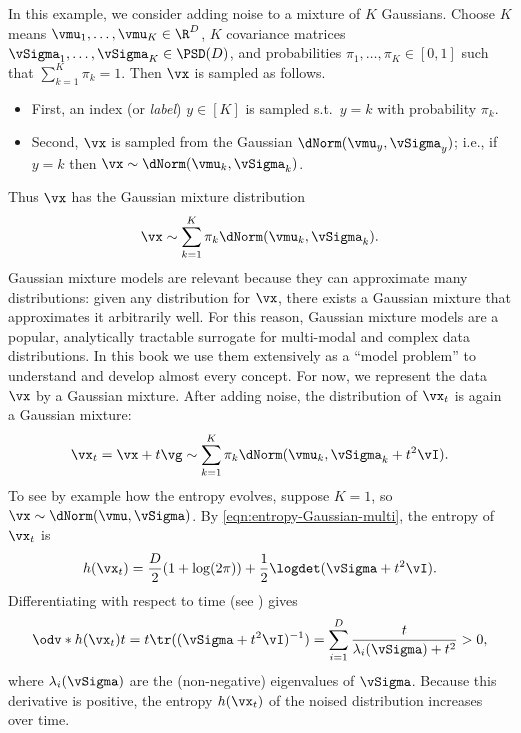 \documentclass[../../book-main.tex]{subfiles}
\begin{document}
\begin{example}\label{ex:gaussian_mixture}
    In this example, we consider adding noise to a mixture of \(K\)
    Gaussians. Choose \(K\) means
    \(\vmu_{1}, \dots, \vmu_{K} \in \R^{D}\), \(K\) covariance
    matrices \(\vSigma_{1}, \dots, \vSigma_{K} \in \PSD(D)\), and
    probabilities \(\pi_{1}, \dots, \pi_{K} \in [0, 1]\) such that
    \(\sum_{k = 1}^{K}\pi_{k} = 1\). Then \(\vx\) is sampled as
    follows.
    \begin{itemize}
        \item First, an index (or \textit{label}) \(y \in [K]\) is
            sampled s.t.~\(y = k\) with probability \(\pi_{k}\).
        \item Second, \(\vx\) is sampled from the Gaussian
            \(\dNorm(\vmu_{y}, \vSigma_{y})\); i.e., if \(y = k\) then
            \(\vx \sim \dNorm(\vmu_{k}, \vSigma_{k})\).
    \end{itemize}
    Thus \(\vx\) has the Gaussian mixture distribution
    \begin{equation}
        \vx \sim \sum_{k = 1}^{K}\pi_{k}\dNorm(\vmu_{k}, \vSigma_{k}).
    \end{equation}
    Gaussian mixture models are relevant because they can approximate
    many distributions: given any distribution for \(\vx\), there
    exists a Gaussian mixture that approximates it arbitrarily well.
    For this reason, Gaussian mixture models are a popular,
    analytically tractable surrogate for multi-modal and complex data
    distributions. In this book we use them extensively as a ``model
    problem'' to understand and develop almost every concept. For now,
    we represent the data \(\vx\) by a Gaussian mixture. After adding
    noise, the distribution of \(\vx_{t}\) is again a Gaussian
    mixture:
    \begin{equation}
        \vx_{t} = \vx + t\vg \sim \sum_{k =
        1}^{K}\pi_{k}\dNorm(\vmu_{k}, \vSigma_{k} + t^{2}\vI).
    \end{equation}
    To see by example how the entropy evolves, suppose \(K = 1\), so
    \(\vx \sim \dNorm(\vmu, \vSigma)\). By
    \eqref{eqn:entropy-Gaussian-multi}, the entropy of \(\vx_{t}\) is
    \begin{equation}
        h(\vx_{t}) = \frac{D}{2}(1 + \log(2\pi)) +
        \frac{1}{2}\logdet(\vSigma + t^{2}\vI).
    \end{equation}
    Differentiating with respect to time (see )
    gives
    \begin{equation}
        \odv*{h(\vx_{t})}{t} = t\tr((\vSigma + t^{2}\vI)^{-1}) =
        \sum_{i = 1}^{D}\frac{t}{\lambda_{i}(\vSigma) + t^{2}} > 0,
    \end{equation}
    where \(\lambda_{i}(\vSigma)\) are the (non-negative) eigenvalues of
    \(\vSigma\). Because this derivative is positive, the entropy
    \(h(\vx_{t})\) of the noised distribution increases over time.
\end{example}
\end{document}
